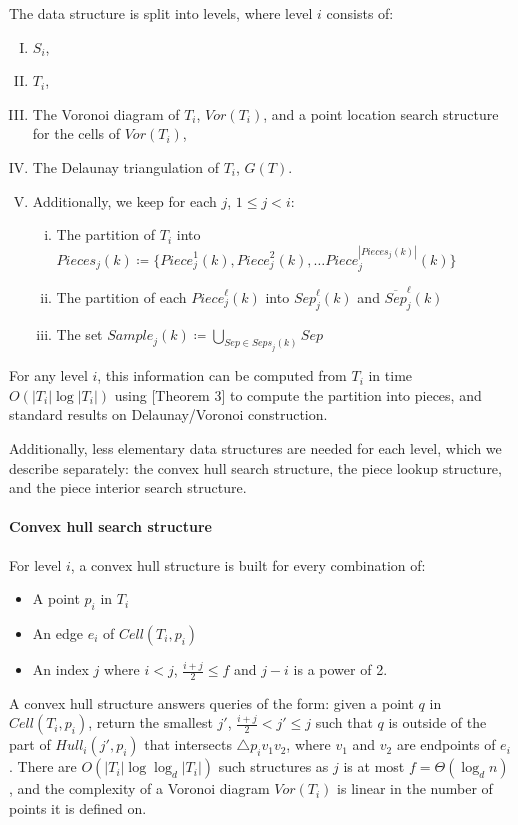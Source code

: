 \documentclass[12pt,a4paper,USenglish,cleveref, autoref, thm-restate]{article}
\newcommand{\Cell}{\mathit{Cell}}
\newcommand{\Sample}{\mathit{Sample}}
\newcommand{\Piece}{\mathit{Piece}}
\newcommand{\Pieces}{\mathit{Pieces}}
\newcommand{\Sep}{\mathit{Sep}}
\newcommand{\Seps}{\mathit{Seps}}
\newcommand{\Hull}{\mathit{Hull}}
\newcommand{\Voron}{\mathit{Vor}}
\newcommand{\Cell}{\mathit{Cell}}
\newcommand{\Sample}{\mathit{Sample}}
\newcommand{\Piece}{\mathit{Piece}}
\newcommand{\Pieces}{\mathit{Pieces}}
\newcommand{\Sep}{\mathit{Sep}}
\newcommand{\Seps}{\mathit{Seps}}
\newcommand{\Hull}{\mathit{Hull}}
\newcommand{\Voron}{\mathit{Vor}}
\newcommand{\Cell}{\mathit{Cell}}
\newcommand{\Sample}{\mathit{Sample}}
\newcommand{\Piece}{\mathit{Piece}}
\newcommand{\Pieces}{\mathit{Pieces}}
\newcommand{\Sep}{\mathit{Sep}}
\newcommand{\Seps}{\mathit{Seps}}
\newcommand{\Hull}{\mathit{Hull}}
\newcommand{\Voron}{\mathit{Vor}}
\begin{document}
The data structure is split into levels, where level $i$ consists of:
\begin{enumerate}[I.]
\item $S_i$,
\item $T_i$,
\item The Voronoi diagram of $T_i$, $\Voron(T_i)$, and a point location search structure for the cells of $\Voron(T_i)$,
\item The Delaunay triangulation of $T_i$, $G(T)$.
\item Additionally, we keep for each $j$, $1\leq j <i$:
    \begin{enumerate}[i.]%
        \item The partition of $T_i$ into $\Pieces_j(k) \coloneqq \{\Piece_j^1(k), \Piece^2_j(k), \ldots  \Piece^{|\Pieces_j(k)|}_j(k)\}$
        \item The partition of each $\Piece_j^\ell(k)$ into $\Sep_j^\ell(k)$ and $\overline{Sep}_j^\ell(k)$
        \item The set $\Sample_j(k) \coloneqq \bigcup_{Sep \in \Seps_j(k)} Sep$
    \end{enumerate}
\end{enumerate}
For any level $i$, this information can be computed from $T_i$ in time $O(|T_i| \log |T_i|)$ using \cite{KleinMS13}[Theorem 3] to compute the partition into pieces, and standard results on Delaunay/Voronoi construction.

Additionally, less elementary data structures are needed for each level, which we describe separately: the convex hull search structure, the piece lookup structure, and the piece interior search structure.

\paragraph*{Convex hull search structure}

For level $i$, a convex hull structure is built for every combination of:
\begin{itemize}
 \setlength{\itemsep}{1pt}
\setlength{\parskip}{0pt}
\setlength{\parsep}{0pt} 
	\item A point $p_i$ in $T_i$
	\item An edge $e_i$ of $\Cell(T_i,p_i)$
	\item An index $j$ where $i < j$, $\frac{i+j}{2}\leq f$ and $j-i$ is a power of 2.
        \end{itemize}
        A convex hull structure answers queries of the form: given a point $q$ in $\Cell(T_i,p_i)$, return the smallest $j'$, $\frac{i+j}{2}< j'\leq j$ such that  $q$ is outside of the part of $\Hull_i(j',p_i)$ that intersects $\triangle p_iv_1v_2$, where $v_1$ and $v_2$ are endpoints of $e_i$. There are $O(|T_i| \log \log_d |T_i|)$ such structures as $j$ is at most $f=\Theta(\log_d n)$, and the complexity of a Voronoi diagram $\Voron(T_i)$ is linear in the number of points it is defined on.
\end{document}
